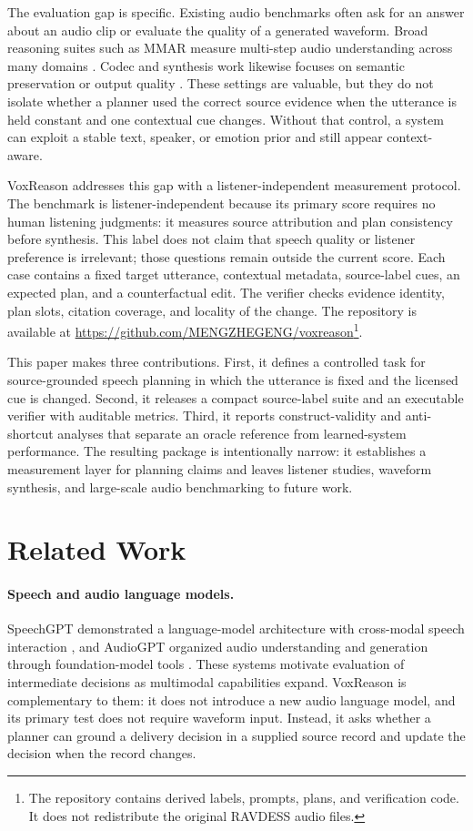 \documentclass{article}
\newcommand{\repo}{\url{https://github.com/MENGZHEGENG/voxreason}}
\begin{document}
The evaluation gap is specific. Existing audio benchmarks often ask for an answer about an audio clip or evaluate the quality of a generated waveform. Broad reasoning suites such as MMAR measure multi-step audio understanding across many domains \cite{mmar}. Codec and synthesis work likewise focuses on semantic preservation or output quality \cite{codec}. These settings are valuable, but they do not isolate whether a planner used the correct source evidence when the utterance is held constant and one contextual cue changes. Without that control, a system can exploit a stable text, speaker, or emotion prior and still appear context-aware.

VoxReason addresses this gap with a listener-independent measurement protocol. The benchmark is listener-independent because its primary score requires no human listening judgments: it measures source attribution and plan consistency before synthesis. This label does not claim that speech quality or listener preference is irrelevant; those questions remain outside the current score. Each case contains a fixed target utterance, contextual metadata, source-label cues, an expected plan, and a counterfactual edit. The verifier checks evidence identity, plan slots, citation coverage, and locality of the change. The repository is available at \repo\footnote{The repository contains derived labels, prompts, plans, and verification code. It does not redistribute the original RAVDESS audio files.}.

This paper makes three contributions. First, it defines a controlled task for source-grounded speech planning in which the utterance is fixed and the licensed cue is changed. Second, it releases a compact source-label suite and an executable verifier with auditable metrics. Third, it reports construct-validity and anti-shortcut analyses that separate an oracle reference from learned-system performance. The resulting package is intentionally narrow: it establishes a measurement layer for planning claims and leaves listener studies, waveform synthesis, and large-scale audio benchmarking to future work.

\section{Related Work}

\paragraph{Speech and audio language models.}
SpeechGPT demonstrated a language-model architecture with cross-modal speech interaction \cite{speechgpt}, and AudioGPT organized audio understanding and generation through foundation-model tools \cite{audiogpt}. These systems motivate evaluation of intermediate decisions as multimodal capabilities expand. VoxReason is complementary to them: it does not introduce a new audio language model, and its primary test does not require waveform input. Instead, it asks whether a planner can ground a delivery decision in a supplied source record and update the decision when the record changes.
\end{document}
